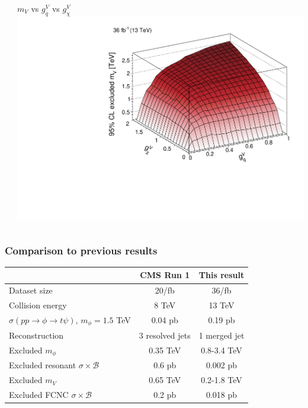 \documentclass[aspectratio=169,xcolor=dvipsnames,,table,compress]{beamer}
\begin{document}
\begin{frame}[t]
\begin{columns}
\begin{column}{0.33\textwidth}
    \end{column}
    \begin{column}{0.33\textwidth}
      \centering $m_V$ vs $g_q^V$ vs $g_\chi^V$  \\ 
      \includegraphics[width=\textwidth]{../figures/monotop/results/fcnc3d_obs_vector.pdf}
    \end{column}
  \end{columns}
\end{frame}

\begin{frame}[t] \frametitle{Comparison to previous results}
  \centering 
  \vspace{7mm}
  \begin{tabular}{l|c|c} 
    & CMS Run 1 & This result \\ 
    \hline \hline 
    Dataset size & 20/fb & 36/fb \\ 
    Collision energy & 8 TeV & 13 TeV \\ 
    $\sigma(pp\rightarrow\phi\rightarrow t\psi)$, $m_\phi = 1.5$ TeV & 0.04 pb & 0.19 pb \\ 
    Reconstruction & 3 resolved jets & 1 merged jet \\  
    \hline
    Excluded $m_\phi$ & 0.35 TeV & 0.8-3.4 TeV \\ 
    Excluded resonant $\sigma\times \mathcal{B}$ & 0.6 pb & 0.002 pb \\  
    \hline
    Excluded $m_V$ & 0.65 TeV & 0.2-1.8 TeV \\ 
    Excluded FCNC $\sigma\times \mathcal{B}$ & 0.2 pb & 0.018 pb \\  
  \end{tabular}
\end{frame}
\end{document}
